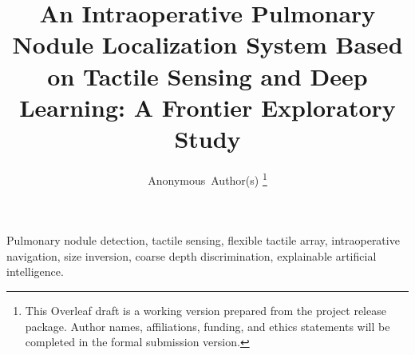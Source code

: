 \documentclass[journal]{IEEEtran}
\begin{document}
\title{An Intraoperative Pulmonary Nodule Localization System Based on Tactile Sensing and Deep Learning: A Frontier Exploratory Study}

\author{Anonymous~Author(s)
\thanks{This Overleaf draft is a working version prepared from the project release package. Author names, affiliations, funding, and ethics statements will be completed in the formal submission version.}}


\maketitle



\begin{IEEEkeywords}
Pulmonary nodule detection, tactile sensing, flexible tactile array, intraoperative navigation, size inversion, coarse depth discrimination, explainable artificial intelligence.
\end{IEEEkeywords}









\end{document}
